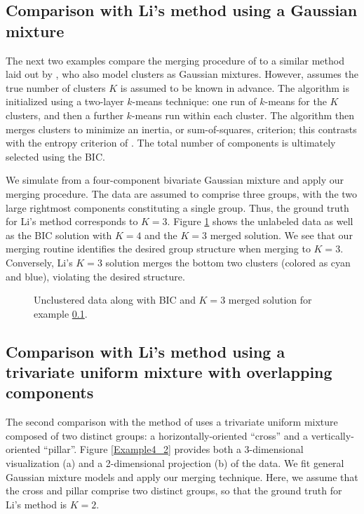 \documentclass{uwstat572}
\renewcommand\;{\,}
\begin{document}
\subsection{Comparison with Li's method using a Gaussian mixture}\label{four}
The next two examples compare the merging procedure of \cite{Baudry10} to a similar method laid out by \cite{Li05}, who also model clusters as Gaussian mixtures.
However, \cite{Li05} assumes the true number of clusters $K$ is assumed to be known in advance.
The algorithm is initialized using a two-layer $k$-means technique: one run of $k$-means for the $K$ clusters, and then a further $k$-means run within each cluster. 
The algorithm then merges clusters to minimize an inertia, or sum-of-squares, criterion; this contrasts with the entropy criterion of \cite{Baudry10}.
The total number of components is ultimately selected using the BIC.

We simulate from a four-component bivariate Gaussian mixture and apply our merging procedure.
The data are assumed to comprise three groups, with the two large rightmost components constituting a single group.
Thus, the ground truth for Li's method corresponds to $K = 3$.
Figure \ref{Example4_1} shows the unlabeled data as well as the BIC solution with $K = 4$ and the $K = 3$ merged solution.
We see that our merging routine identifies the desired group structure when merging to $K = 3$.
Conversely, Li's $K = 3$ solution merges the bottom two clusters (colored as cyan and blue), violating the desired structure.


\begin{figure}\label{Example4_1}
\begin{center}
\end{center}
\caption{Unclustered data along with BIC and $K = 3$ merged solution for example \ref{four}.}
\end{figure}

\subsection{Comparison with Li's method using a trivariate uniform mixture with overlapping components}\label{five}
The second comparison with the method of \cite{Li05} uses a trivariate uniform mixture composed of two distinct groups: a horizontally-oriented ``cross'' and a vertically-oriented ``pillar''.
Figure \ref{Example4_2} provides both a 3-dimensional visualization (a) and a 2-dimensional projection (b) of the data.
We fit general Gaussian mixture models and apply our merging technique.
Here, we assume that the cross and pillar comprise two distinct groups, so that the ground truth for Li's method is $K = 2$. 
\end{document}

